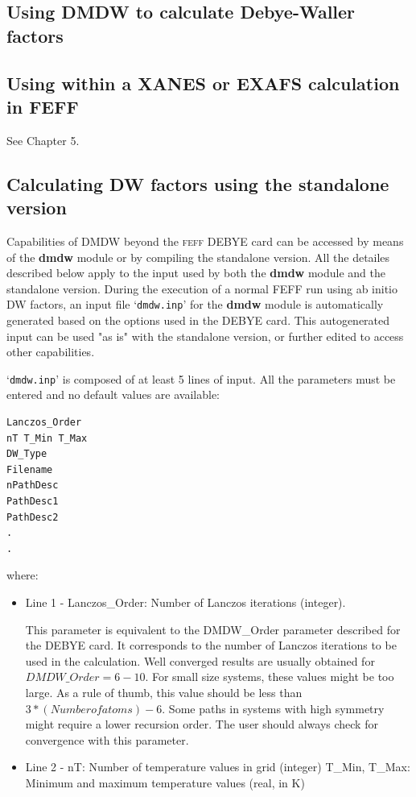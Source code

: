 \documentclass[11pt,oneside]{report} %
\renewcommand{\htmlref}[2]{\hyperlink{#2}{#1}}
\newcommand{\program}[1]{\textsc{#1}}
\newcommand{\feff}{\program{feff}}
\newcommand{\file}[1]{`\texttt{#1}'}
\newcommand{\module}[1]{\textrm{\bf{#1}}}
\renewcommand{\htmlref}[2]{{#1}} %
\begin{document}
\begin{latexonly}
\section{Using DMDW to calculate Debye-Waller factors}
\label{sec:Append-G-DMDW-Use}
\subsection{Using within a XANES or EXAFS calculation in FEFF}
See \htmlref{Chapter 5}{sec:DWfactors}.

\subsection{Calculating DW factors using the standalone version}
Capabilities of DMDW beyond the {\feff} DEBYE card can be accessed by means of the \module{dmdw} module or by
compiling the standalone version. All the detailes described below apply to
the input used by both the \module{dmdw} module and the standalone version. During the
execution of a normal FEFF run using ab initio DW factors, an input file \file{dmdw.inp} for the
\module{dmdw} module is automatically generated based on the options used in the DEBYE
card. This autogenerated input can be used "as is" with the standalone version,
or further edited to access other capabilities.

\file{dmdw.inp} is composed of at least 5 lines of input.  All the
parameters must be entered and no default values are available:
\begin{verbatim}
Lanczos_Order
nT T_Min T_Max
DW_Type
Filename
nPathDesc
PathDesc1
PathDesc2
.
.
\end{verbatim}
where:
\begin{itemize}
\item Line  1 - Lanczos\_Order: Number of Lanczos iterations (integer).

  This parameter is equivalent to the DMDW\_Order parameter described for
  the DEBYE card. It corresponds to the number of Lanczos iterations to be used
  in the calculation. Well converged results are usually obtained for
  $DMDW\_Order=6-10$. For small size systems, these values might be too large. As a
  rule of thumb, this value should be less than $3*(Number of atoms)-6$. Some
  paths in systems with high symmetry might require a lower recursion
  order. The user should always check for convergence with this parameter.

\item Line  2 - nT: Number of temperature values in grid (integer)
          T\_Min, T\_Max: Minimum and maximum temperature values (real, in K)


\end{itemize}
\end{latexonly}
\end{document}
